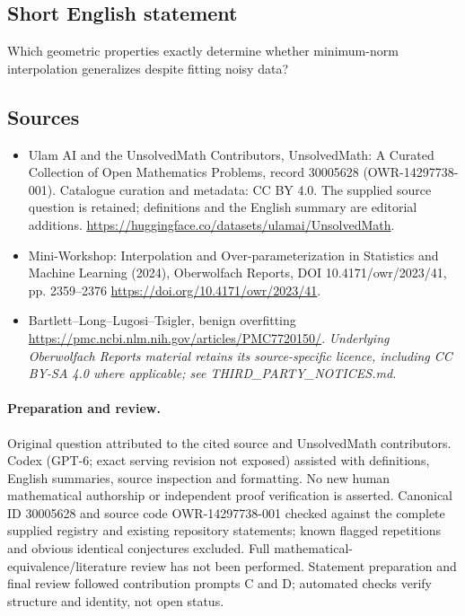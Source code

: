 \documentclass[11pt]{article}
\begin{document}
\subsection{Short English statement}
Which geometric properties exactly determine whether minimum-norm interpolation generalizes despite fitting noisy data?
\subsection{Sources}
\begin{itemize}
\item[\hypertarget{source:30005628:1}{S1}] Ulam AI and the UnsolvedMath Contributors, UnsolvedMath: A Curated Collection of Open Mathematics Problems, record 30005628 (OWR-14297738-001). Catalogue curation and metadata: CC BY 4.0. The supplied source question is retained; definitions and the English summary are editorial additions.
\url{https://huggingface.co/datasets/ulamai/UnsolvedMath}.
\item[\hypertarget{source:30005628:2}{S2}] Mini-Workshop: Interpolation and Over-parameterization in Statistics and Machine Learning​ (2024), Oberwolfach Reports, DOI 10.4171/owr/2023/41, pp. 2359--2376
\url{https://doi.org/10.4171/owr/2023/41}.
\item[\hypertarget{source:30005628:3}{S3}] Bartlett--Long--Lugosi--Tsigler, benign overfitting
\url{https://pmc.ncbi.nlm.nih.gov/articles/PMC7720150/}.
\textit{Underlying Oberwolfach Reports material retains its source-specific licence, including CC BY-SA 4.0 where applicable; see THIRD\_PARTY\_NOTICES.md.}
\end{itemize}
\paragraph{Preparation and review.}
Original question attributed to the cited source and UnsolvedMath contributors. Codex (GPT-6; exact serving revision not exposed) assisted with definitions, English summaries, source inspection and formatting. No new human mathematical authorship or independent proof verification is asserted. Canonical ID 30005628 and source code OWR-14297738-001 checked against the complete supplied registry and existing repository statements; known flagged repetitions and obvious identical conjectures excluded. Full mathematical-equivalence/literature review has not been performed. Statement preparation and final review followed contribution prompts C and D; automated checks verify structure and identity, not open status.
\label{end:30005628}
\end{document}
